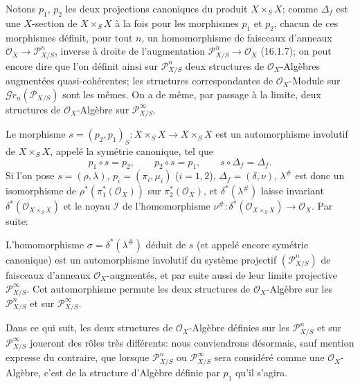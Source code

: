 \begin{env}[16.3.2]
\label{IV.16.3.2}
Notons $p_1$, $p_2$ les deux projections canoniques du produit $X\times_S X$;
comme $\Delta_f$ est une $X$-section de $X\times_S X$ à la fois pour les
morphismes $p_1$ et $p_2$, chacun de ces morphismes définit, pour tout $n$, un
homomorphisme de faisceaux d'anneaux $\mathcal{O}_X\to\mathscr{P}_{X/S}^n$,
inverse à droite de l'augmentation $\mathscr{P}_{X/S}^n\to\mathcal{O}_X$
(16.1.7); on peut encore dire que l'on définit ainsi sur
$\mathscr{P}_{X/S}^n$ deux structures de $\mathcal{O}_X$-Algèbres augmentées
quasi-cohérentes; les structures correspondantes de $\mathcal{O}_X$-Module sur
$\mathscr{G}r_n(\mathscr{P}_{X/S})$ sont les mêmes. On a de même, par passage à
la limite, deux structures de $\mathcal{O}_X$-Algèbre sur
$\mathscr{P}_{X/S}^\infty$.
\end{env}

\begin{env}[16.3.3]
\label{IV.16.3.3}
Le morphisme $s=(p_2,p_1)_S:X\times_S X\to X\times_S X$ est un automorphisme
involutif de $X\times_S X$, appelé la symétrie canonique, tel que
\[
  p_1\circ s=p_2,\qquad p_2\circ s=p_1,\qquad s\circ\Delta_f=\Delta_f.
  \tag{16.3.3.1}
  \label{IV.16.3.3.1}
\]
Si l'on pose $s=(\rho,\lambda)$, $p_i=(\pi_i,\mu_i)$ ($i=1,2$),
$\Delta_f=(\delta,\nu)$, $\lambda^\#$ est donc un isomorphisme de
$\rho^*(\pi_1^*(\mathcal{O}_X))$ sur $\pi_2^*(\mathcal{O}_X)$, et
$\delta^*(\lambda^\#)$ laisse invariant $\delta^*(\mathcal{O}_{X\times_S X})$
et le noyau $\mathscr{I}$ de l'homomorphisme
$\nu^\#:\delta^*(\mathcal{O}_{X\times_S X})\to\mathcal{O}_X$. Par suite:
\end{env}

\begin{proposition}[16.3.4]
\label{IV.16.3.4}
L'homomorphisme $\sigma=\delta^*(\lambda^\#)$ déduit de $s$ (et appelé encore
symétrie canonique) est un automorphisme involutif du système projectif
$(\mathscr{P}_{X/S}^n)$ de faisceaux
d'anneaux $\mathcal{O}_X$-augmentés, et par suite aussi de leur limite projective
$\mathscr{P}_{X/S}^\infty$. Cet automorphisme permute les deux structures de
$\mathcal{O}_X$-Algèbre sur les $\mathscr{P}_{X/S}^n$ et sur
$\mathscr{P}_{X/S}^\infty$.
\end{proposition}

\begin{env}[16.3.5]
\label{IV.16.3.5}
Dans ce qui suit, les deux structures de $\mathcal{O}_X$-Algèbre définies sur les
$\mathscr{P}_{X/S}^n$ et sur $\mathscr{P}_{X/S}^\infty$ joueront des rôles très
différents: nous conviendrons désormais, sauf mention expresse du contraire,
que lorsque $\mathscr{P}_{X/S}^n$ ou $\mathscr{P}_{X/S}^\infty$ sera considéré
comme une $\mathcal{O}_X$-Algèbre, c'est de la structure d'Algèbre définie par
$p_1$ qu'il s'agira.
\end{env}

